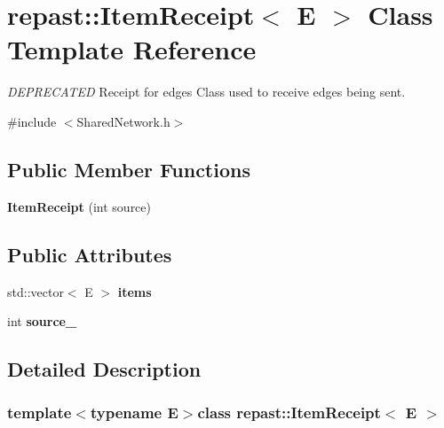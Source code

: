 \hypertarget{classrepast_1_1_item_receipt}{\section{repast\-:\-:Item\-Receipt$<$ E $>$ Class Template Reference}
\label{classrepast_1_1_item_receipt}
}


{\itshape D\-E\-P\-R\-E\-C\-A\-T\-E\-D} Receipt for edges Class used to receive edges being sent.  




{\ttfamily \#include $<$Shared\-Network.\-h$>$}

\subsection*{Public Member Functions}
\begin{DoxyCompactItemize}
\item 
\hypertarget{classrepast_1_1_item_receipt_a88b27d495278d41c0a427840e1571a83}{{\bfseries Item\-Receipt} (int source)}\label{classrepast_1_1_item_receipt_a88b27d495278d41c0a427840e1571a83}

\end{DoxyCompactItemize}
\subsection*{Public Attributes}
\begin{DoxyCompactItemize}
\item 
\hypertarget{classrepast_1_1_item_receipt_aa72eac73d1a8eee74efc7e100e503330}{std\-::vector$<$ E $>$ {\bfseries items}}\label{classrepast_1_1_item_receipt_aa72eac73d1a8eee74efc7e100e503330}

\item 
\hypertarget{classrepast_1_1_item_receipt_ae7a0c999195107c1dc66dfd9cf862958}{int {\bfseries source\-\_\-}}\label{classrepast_1_1_item_receipt_ae7a0c999195107c1dc66dfd9cf862958}

\end{DoxyCompactItemize}


\subsection{Detailed Description}
\subsubsection*{template$<$typename E$>$class repast\-::\-Item\-Receipt$<$ E $>$}

